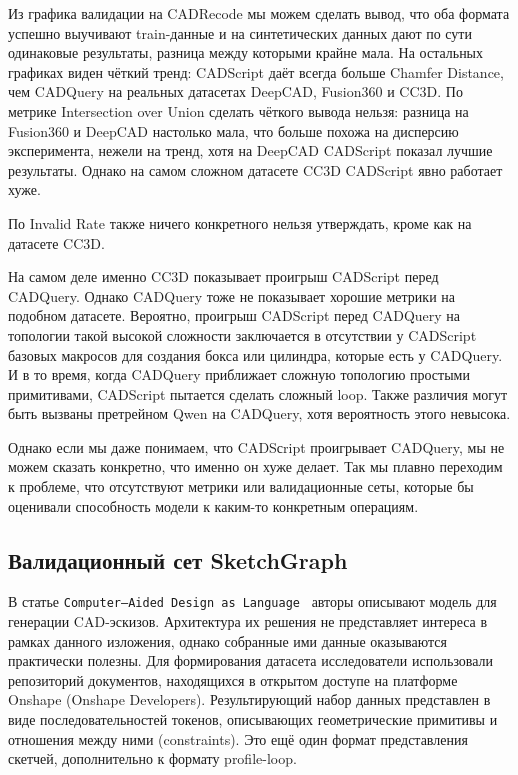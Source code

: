 Из графика валидации на CADRecode мы можем сделать вывод, что оба формата успешно выучивают train-данные и на синтетических данных дают по сути одинаковые результаты, разница между которыми крайне мала.
На остальных графиках виден чёткий тренд: CADScript даёт всегда больше Chamfer Distance, чем CADQuery на реальных датасетах DeepCAD, Fusion360 и CC3D.
По метрике Intersection over Union сделать чёткого вывода нельзя: разница на Fusion360 и DeepCAD настолько мала, что больше похожа на дисперсию эксперимента, нежели на тренд, хотя на DeepCAD CADScript показал лучшие результаты.
Однако на самом сложном датасете CC3D CADScript явно работает хуже.

По Invalid Rate также ничего конкретного нельзя утверждать, кроме как на датасете CC3D.

На самом деле именно CC3D показывает проигрыш CADScript перед CADQuery. Однако CADQuery тоже не показывает хорошие метрики на подобном датасете.
Вероятно, проигрыш CADScript перед CADQuery на топологии такой высокой сложности заключается в отсутствии у CADScript базовых макросов для создания бокса или цилиндра, которые есть у CADQuery.
И в то время, когда CADQuery приближает сложную топологию простыми примитивами, CADScript пытается сделать сложный loop. Также различия могут быть вызваны претрейном Qwen на CADQuery, хотя вероятность этого невысока.

Однако если мы даже понимаем, что CADSсript проигрывает CADQuery, мы не можем сказать конкретно, что именно он хуже делает.
Так мы плавно переходим к проблеме, что отсутствуют метрики или валидационные сеты, которые бы оценивали способность модели к каким-то конкретным операциям.

\subsection{Валидационный сет SketchGraph}

В статье \texttt{Computer--Aided Design as Language}~\cite{ganin21_cadlanguage} авторы описывают модель для генерации CAD-эскизов. Архитектура их решения не представляет интереса в рамках данного изложения, однако собранные ими данные оказываются практически полезны.
Для формирования датасета исследователи использовали репозиторий документов, находящихся в открытом доступе на платформе Onshape (Onshape Developers). Результирующий набор данных представлен в виде последовательностей токенов, описывающих геометрические примитивы и отношения между ними (constraints). Это ещё один формат представления скетчей, дополнительно к формату profile-loop.

